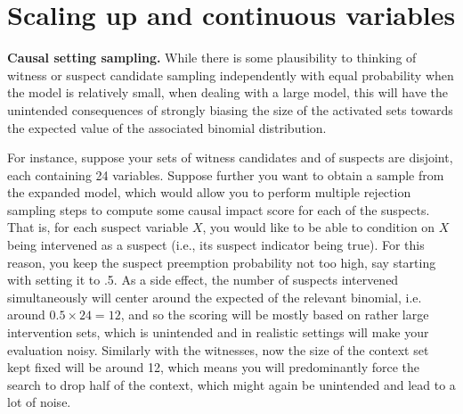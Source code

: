 \documentclass[twoside,11pt]{article}
\begin{document}




\section{Scaling up and continuous variables}
\label{sec:scaling}


\vspace{2mm}
\noindent \textbf{Causal setting sampling.} While there is some plausibility to thinking of witness or suspect candidate sampling independently with equal probability when the model is relatively small, when dealing with a large model, this will have the unintended consequences of strongly biasing the size of the activated sets towards the expected value of the associated binomial distribution. 

For instance, suppose your sets of witness candidates and of suspects are disjoint, each containing 24 variables. Suppose further you want to obtain a sample from the expanded model, which would allow you to perform multiple rejection sampling steps to compute some causal impact score for each of the suspects. That is, for each suspect variable $X$, you would like to be able to condition on $X$ being intervened as a suspect (i.e., its suspect indicator being true). For this reason, you keep the suspect preemption probability not too high, say starting with setting it to .5. As a side effect, the number of suspects intervened simultaneously will center around the expected of the relevant binomial, i.e. around $0.5 \times 24 = 12$, and so the scoring will be mostly based on rather large intervention sets, which is unintended and in realistic settings will make your evaluation noisy. Similarly with the witnesses, now the size of the context set kept fixed will be around 12, which means you will predominantly force the search to drop half of the context, which might again be unintended and lead to a lot of noise. 
\end{document}
